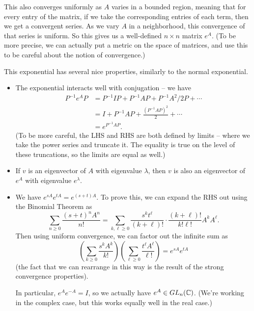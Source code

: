 
This also converges uniformly as $A$ varies in a bounded region, meaning that for every entry of the matrix, if we take the corresponding entries of each term, then we get a convergent series. As we vary $A$ in a neighborhood, this convergence of that series is uniform. So this gives us a well-defined $n \times n$ matrix $e^A$. (To be more precise, we can actually put a metric on the space of matrices, and use this to be careful about the notion of convergence.)

This exponential has several nice properties, similarly to the normal exponential.
\begin{itemize}
    \item The exponential interacts well with conjugation -- we have 
    \begin{align*} P^{-1}e^AP &= P^{-1}IP + P^{-1}AP + P^{-1}A^2/2 P + \cdots \\ 
    &= I + P^{-1}AP + \frac{(P^{-1}AP)^2}{2} + \cdots \\
    &= e^{P^{-1}AP}.\end{align*} (To be more careful, the LHS and RHS are both defined by limits -- where we take the power series and truncate it. The equality is true on the level of these truncations, so the limits are equal as well.)
    
    \item If $v$ is an eigenvector of $A$ with eigenvalue $\lambda$, then $v$ is also an eigenvector of $e^A$ with eigenvalue $e^\lambda$. 
    
    \item We have $e^{sA}e^{tA} = e^{(s + t)A}$. To prove this, we can expand the RHS out using the Binomial Theorem as \[\sum_{n \geq 0} \frac{(s + t)^nA^n}{n!} = \sum_{k, \ell \geq 0} \frac{s^kt^\ell}{(k + \ell)!}\cdot \frac{(k + \ell)!}{k!\ell!}A^kA^\ell.\] Then using uniform convergence, we can factor out the infinite sum as \[\left(\sum_{k\geq 0} \frac{s^kA^k}{k!}\right)\left(\sum_{\ell \geq 0} \frac{t^\ell A^\ell}{\ell!}\right) = e^{sA}e^{tA}\] (the fact that we can rearrange in this way is the result of the strong convergence properties). 
    
    In particular, $e^A e^{-A} = I$, so we actually have $e^A \in GL_n(\mathbb C)$. (We're working in the complex case, but this works equally well in the real case.)
\end{itemize}


